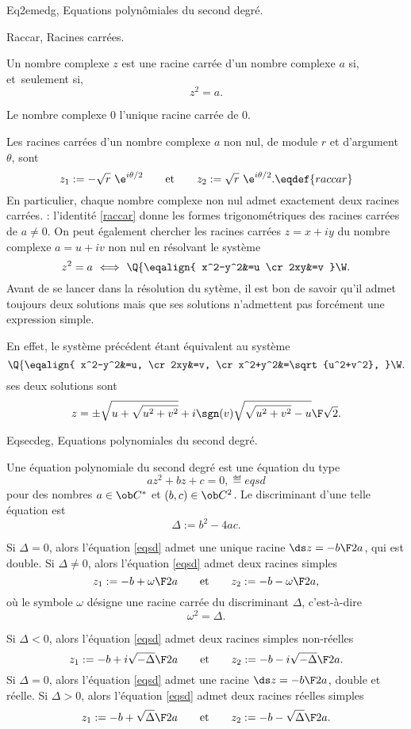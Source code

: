 \Section Eq2emedg, Equations polynômiales du second degré. 

\Subsection Raccar, Racines carrées. 

\Definition [] Un nombre complexe {$z$ est une racine carrée d'un nombre complexe $a$} si, et~seulement si, 
$$
{z^2=a}.
$$
\medskip

\Propriete [] Le nombre complexe $0$ l'unique racine carrée de $0$. \par
\noindent Les racines carrées d'un nombre complexe {$a$ non nul, de module $r$ et d'argument $\theta$}, sont 
$$
z_1:={-\sqrt r\ \e^{i\theta/2}}\qquad\mbox{et}\qquad z_2:={\sqrt r\ \e^{i\theta/2}}. \eqdef{raccar}
$$
En particulier, chaque nombre complexe non nul admet exactement deux racines carrées. 
\bigskip
\Remarque : l'identité \eqref{raccar} donne les formes trigonométriques des racines carrées de $a\neq0$. 
On peut également chercher les racines carrées $z=x+iy$ du nombre complexe $a=u+iv$ non nul
en résolvant le système
$$
z^2=a\ \Longleftrightarrow\ \Q\{\eqalign{
x^2-y^2&=u
\cr
2xy&=v
}\W.
$$
Avant de se lancer dans la résolution du sytème, il est bon de savoir qu'il admet toujours deux solutions 
mais que ses solutions n'admettent pas forcément une expression simple. 

En effet, le système précédent étant équivalent au système 
$$
 \Q\{\eqalign{
x^2-y^2&=u,
\cr
2xy&=v,
\cr
x^2+y^2&=\sqrt{u^2+v^2},
}\W.
$$
ses deux solutions sont 
$$
z=\pm{\sqrt{u+\sqrt{u^2+v^2}}+i\sgn(v)\sqrt{\sqrt{u^2+v^2}-u}\F\sqrt2}.
$$


\Subsection Eqsecdeg, Equations polynomiales du second degré. 

\Definition [] Une équation polynomiale du second degré est une équation du type 
$$
az^2+bz+c=0,\eqdef{eqsd}
$$
pour des nombres $a\in\ob C^*$ et $(b,c)\in\ob C^2$. Le {discriminant} d'une telle équation est 
$$
{\Delta:=b^2-4ac}. 
$$
\bigskip

\Theoreme [$a\in\ob C^*$ et ${(a,b)}\in\ob C^2$]
\Bullet Si {$\Delta=0$}, alors l'équation \eqref{eqsd} admet une {unique racine} $\ds z={-b\F2a}$, qui est {double}.
\Bullet Si {$\Delta\neq0$}, alors l'équation \eqref{eqsd} admet {deux racines simples} 
$$
z_1:={-b+\omega\F2a}\qquad\mbox{et}\qquad z_2:={-b-\omega\F2a},
$$
où le symbole $\omega$ désigne une racine carrée du discriminant $\Delta$, c'est-à-dire 
 $$
\omega^2=\Delta.
$$

\Bullet Si {$\Delta<0$}, alors l'équation \eqref{eqsd} admet {deux racines simples non-réelles}  
$$
z_1:={-b+i\sqrt{-\Delta}\F2a}\qquad\mbox{et}\qquad z_2:={-b-i\sqrt{-\Delta}\F2a}.
$$
\Bullet Si {$\Delta=0$}, alors l'équation \eqref{eqsd} admet {une racine} $\ds z={-b\F2a}$, {double et réelle}.\smallskip
\Bullet Si {$\Delta>0$}, alors l'équation \eqref{eqsd} admet {deux racines réelles simples} 
$$
z_1:={-b+\sqrt\Delta\F2a}\qquad\mbox{et}\qquad z_2:={-b-\sqrt\Delta\F2a}.
$$

